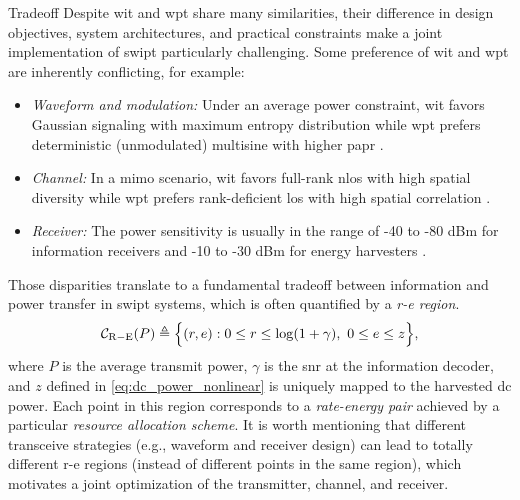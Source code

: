 \begin{section}{}
	\begin{subsection}{ Tradeoff}
		Despite \gls{wit} and \gls{wpt} share many similarities, their difference in design objectives, system architectures, and practical constraints make a joint implementation of \gls{swipt} particularly challenging.
		Some preference of \gls{wit} and \gls{wpt} are inherently conflicting, for example:
		\begin{itemize}
			\item \emph{Waveform and modulation:} Under an average power constraint, \gls{wit} favors Gaussian signaling with maximum entropy distribution \cite{Cover2005} while \gls{wpt} prefers deterministic (unmodulated) multisine with higher \gls{papr} \cite{Trotter2009}.
			\item \emph{Channel:} In a \gls{mimo} scenario, \gls{wit} favors full-rank \gls{nlos} with high spatial diversity while \gls{wpt} prefers rank-deficient \gls{los} with high spatial correlation \cite{Wu2022a}.
			\item \emph{Receiver:} The power sensitivity is usually in the range of -40 to -80 dBm for information receivers and -10 to -30 dBm for energy harvesters \cite{Lu2015}.
		\end{itemize}
		Those disparities translate to a fundamental tradeoff between information and power transfer in \gls{swipt} systems, which is often quantified by a \emph{\gls{r-e} region}.
		\begin{equation}
			\mathcal{C}_\mathrm{R-E}(P) \triangleq \Bigl\{ (r,e) : 0 \le r \le \log(1 + \gamma), \ 0 \le e \le z \Bigr\},
		\end{equation}
		where $P$ is the average transmit power, $\gamma$ is the \gls{snr} at the information decoder, and $z$ defined in \eqref{eq:dc_power_nonlinear} is uniquely mapped to the harvested \gls{dc} power.
		Each point in this region corresponds to a \emph{rate-energy pair} achieved by a particular \emph{resource allocation scheme}.
		It is worth mentioning that different transceive strategies (e.g., waveform and receiver design) can lead to totally different \gls{r-e} regions (instead of different points in the same region), which motivates a joint optimization of the transmitter, channel, and receiver.
	\end{subsection}


\end{section}
